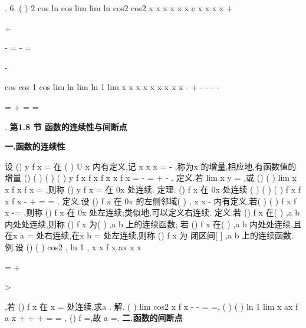 . 
6.
(
)
2 cos
ln
cos
lim
lim
ln cos2
cos2
x
x
x
x
x
x
e
x
x
x
x
+






\to 
\to 




+

-
=
-
=






-










cos
cos
1 cos
lim
ln
lim
ln 1
lim
x
x
x
x
x
x
x
x
x
\to 
\to 
\to 
-
+
-
-
-
-




=
+
=
\cdots 
=








. 
\vspace{6pt}
{\large \bfseries \textcolor{lyred}{第1.8 节 函数的连续性与间断点}}

\vspace{4pt}
{\bfseries \textcolor{lyred}{一.函数的连续性}}

设
()
y
f x
=
在
(
)
U x
内有定义,记
x
x
x
\Delta =
-
,称为x 的\textcolor{lyred}{增量},相应地,有函数值的 
\textcolor{lyred}{增量}
()
(
)
(
)
(
)
y
f x
f x
f x
x
f x
\Delta 
\Delta 
=
-
=
+
-
. 
\textcolor{lyred}{定义}.若
lim
x
y
\Delta 
\Delta 
\to 
=
,或
()
(
)
lim
x
x f x
f x
\to 
=
,则称
()
y
f x
=
在
0x 处\textcolor{lyred}{连续}. 
\textcolor{lyred}{定理}.
()
f x 在
0x 处连续
(
)
(
)
(
)
f x
f x
f x
-
+
\Leftrightarrow 
=
=
. 
\textcolor{lyred}{定义}.设
()
f x 在
0x 的左侧邻域(
)
,
x
x
\delta 
-
内有定义,若(
)
(
)
f x
f x
-=
,则称
()
f x 
在
0x 处\textcolor{lyred}{左连续};类似地,可以定义\textcolor{lyred}{右连续}. 
\textcolor{lyred}{定义}.若
()
f x 在(
)
,a b 内处处连续,则称
()
f x 为(
)
,a b 上的\textcolor{lyred}{连续函数}; 
若
()
f x 在(
)
,a b 内处处连续,且在x
a
=
处右连续,在x
b
=
处左连续,则称
()
f x 为 
闭区间[
]
,a b 上的\textcolor{lyred}{连续函数}. 
\textcolor{lyred}{例}.设
()
(
)
cos2 ,
ln 1
,
x
x
f x
ax
x
x
\le 

=
+

>

,若
()
f x 在
x =
处连续,求a . 
解. (
)
lim cos2
x
f
x
-
-
\to 
=
=, (
)
(
)
ln 1
lim
x
ax
f
a
x
+
+
\to 
+
=
=
,
()
f
=,故
a =. 
\vspace{4pt}
{\bfseries \textcolor{lyred}{二.函数的间断点}}

